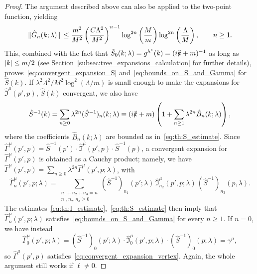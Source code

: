\documentclass[a4paper, 11pt]{article}
\newcommand{\cutoff}{\Lambda}								%
\newcommand{\sing}[2]{{#1}^{#2}}							%
\theoremstyle{thm}
\begin{document}
\begin{proof}
The argument described above can also be applied to the two-point function, yielding
\begin{equation}
\label{eq:th:S_estimate}
\norm*{\hat{G}_n(k; \lambda)} \le \frac{m^2}{M^2} \left(\frac{C \cutoff^{2}}{M^2} \right)^{n-1} \log^{2n} \left( \frac{M}{m} \right) \log^{2n} \left( \frac{\cutoff}{M} \right), \qquad n \ge 1.
\end{equation}
This, combined with the fact that $\hat{S}_0(k; \lambda) = \sing{g}{h^\star}(k) = (i \slashed{k}+ m)^{-1}$ as long as $\abs{k} \le m/2$ (see Section~\ref{subsec:tree_expansions_calculation} for further details), proves~\eqref{eq:convergent_expansion_S} and~\eqref{eq:bounds_on_S_and_Gamma} for $\hat{S}(k)$. If $\lambda^2 \cutoff^2/M^2 \log^2(\cutoff/m)$ is small enough to make the expansions for $\hat{\mathfrak{I}}^\mu(p', p)$, $\hat{S}(k)$ convergent, we also have
\begin{equation}
\label{eq:S_inverse_expansion}
\hat{S}^{-1}(k) = \sum_{n \ge 0} \lambda^{2n} (\hat{S}^{-1})_n(k; \lambda) \equiv (i \slashed{k} + m) \left( 1 + \sum_{n \ge 1} \lambda^{2n} \hat{B}_n(k; \lambda) \right),
\end{equation}
where the coefficients $\hat{B}_n(k; \lambda)$ are bounded as in~\eqref{eq:th:S_estimate}. Since $\hat{\Gamma}^\mu(p', p) = \hat{S}^{-1}(p') \cdot \hat{\mathfrak{I}}^\mu(p', p) \cdot \hat{S}^{-1}(p)$, a convergent expansion for $\hat{\Gamma}^\mu(p', p)$ is obtained as a Cauchy product; namely, we have $\hat{\Gamma}^\mu(p', p) = \sum_{n \ge 0} \lambda^{2n} \hat{\Gamma}^\mu(p', p; \lambda)$, with
\begin{equation}
\label{eq:amp_vertex_cauchy product}
\hat{\Gamma}^\mu_n(p', p; \lambda) = \sum_{\substack{n_1 + n_2 + n_3 = n \\ n_1, n_2, n_3 \ge 0}} (\hat{S}^{-1})_{n_1} (p'; \lambda) \, \hat{\mathfrak{I}}_{n_2}^\mu(p', p; \lambda) \, (\hat{S}^{-1})_{n_3}(p, \lambda).
\end{equation}
The estimates~\eqref{eq:th:I_estimate},~\eqref{eq:th:S_estimate} then imply that $\hat{\Gamma}^\mu_n(p', p; \lambda)$ satisfies~\eqref{eq:bounds_on_S_and_Gamma} for every $n \ge 1$. If $n = 0$, we have instead
\begin{equation}
\hat{\Gamma}^\mu_0(p', p; \lambda) = (\hat{S}^{-1})_0(p'; \lambda) \cdot \hat{\mathfrak{I}}^\mu_0(p', p; \lambda) \cdot (\hat{S}^{-1})_0(p; \lambda) = \gamma^\mu,
\end{equation}
so $\hat{\Gamma}^\mu(p', p)$ satisfies~\eqref{eq:convergent_expansion_vertex}. Again, the whole argument still works if $\ell \ne 0$.
\end{proof}
\end{document}
